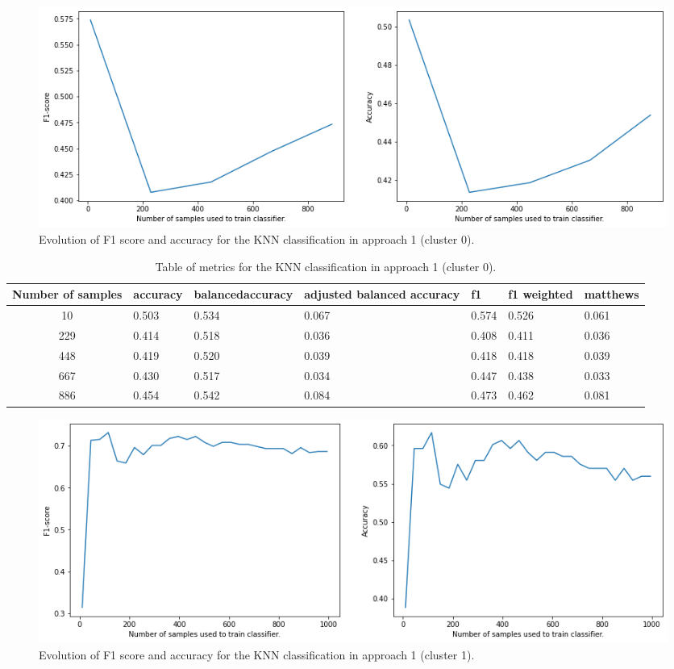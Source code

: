 \documentclass[sigplan,screen]{acmart}
\begin{document}
\begin{figure}[h]
    \centering
    \includegraphics[width=\linewidth]{reports/figures/A1_classification_knn_cluster0.png}
    \caption{Evolution of F1 score and accuracy for the KNN classification in approach 1 (cluster 0).}
    \label{fig:A1_classification_knn_cluster0}
\end{figure}

\begin{table}[h]
  \caption{Table of metrics for the KNN classification in approach 1 (cluster 0).}
  \label{tab:A1_classification_knn_cluster0}
  \begin{tabular}{cllllll}
    \toprule
    Number of samples & accuracy & balancedaccuracy & adjusted balanced accuracy & f1 & f1 weighted & matthews\\
    \midrule
       10 & 0.503 & 0.534 & 0.067 & 0.574 & 0.526 & 0.061\\
      229 & 0.414 & 0.518 & 0.036 & 0.408 & 0.411 & 0.036\\
      448 & 0.419 & 0.520 & 0.039 & 0.418 & 0.418 & 0.039\\
      667 & 0.430 & 0.517 & 0.034 & 0.447 & 0.438 & 0.033\\
      886 & 0.454 & 0.542 & 0.084 & 0.473 & 0.462 & 0.081\\
    \bottomrule
    \end{tabular}
\end{table}

\begin{figure}[h]
    \centering
    \includegraphics[width=\linewidth]{reports/figures/A1_classification_knn_cluster1.png}
    \caption{Evolution of F1 score and accuracy for the KNN classification in approach 1 (cluster 1).}
    \label{fig:A1_classification_knn_cluster1}
\end{figure}
\end{document}
